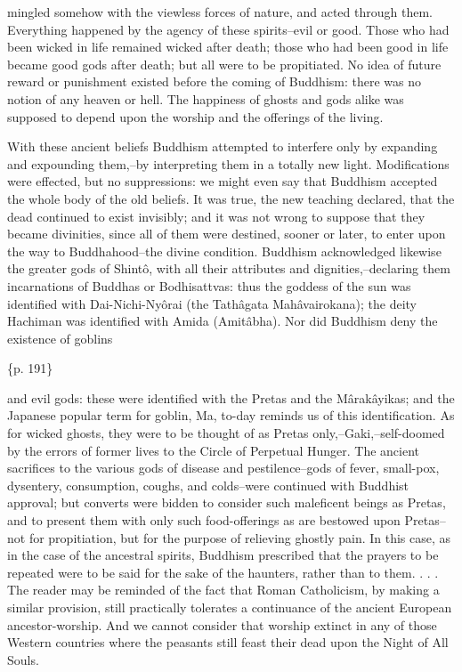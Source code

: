 mingled somehow with the viewless forces of nature, and acted through them. Everything happened by the agency of these spirits--evil or good. Those who had been wicked in life remained wicked after death; those who had been good in life became good gods after death; but all were to be propitiated. No idea of future reward or punishment existed before the coming of Buddhism: there was no notion of any heaven or hell. The happiness of ghosts and gods alike was supposed to depend upon the worship and the offerings of the living.

With these ancient beliefs Buddhism attempted to interfere only by expanding and expounding them,--by interpreting them in a totally new light. Modifications were effected, but no suppressions: we might even say that Buddhism accepted the whole body of the old beliefs. It was true, the new teaching declared, that the dead continued to exist invisibly; and it was not wrong to suppose that they became divinities, since all of them were destined, sooner or later, to enter upon the way to Buddhahood--the divine condition. Buddhism acknowledged likewise the greater gods of Shintô, with all their attributes and dignities,--declaring them incarnations of Buddhas or Bodhisattvas: thus the goddess of the sun was identified with Dai-Nichi-Nyôrai (the Tathâgata Mahâvairokana); the deity Hachiman was identified with Amida (Amitâbha). Nor did Buddhism deny the existence of goblins

\{p. 191\}

and evil gods: these were identified with the Pretas and the Mârakâyikas; and the Japanese popular term for goblin, Ma, to-day reminds us of this identification. As for wicked ghosts, they were to be thought of as Pretas only,--Gaki,--self-doomed by the errors of former lives to the Circle of Perpetual Hunger. The ancient sacrifices to the various gods of disease and pestilence--gods of fever, small-pox, dysentery, consumption, coughs, and colds--were continued with Buddhist approval; but converts were bidden to consider such maleficent beings as Pretas, and to present them with only such food-offerings as are bestowed upon Pretas--not for propitiation, but for the purpose of relieving ghostly pain. In this case, as in the case of the ancestral spirits, Buddhism prescribed that the prayers to be repeated were to be said for the sake of the haunters, rather than to them. . . . The reader may be reminded of the fact that Roman Catholicism, by making a similar provision, still practically tolerates a continuance of the ancient European ancestor-worship. And we cannot consider that worship extinct in any of those Western countries where the peasants still feast their dead upon the Night of All Souls.

